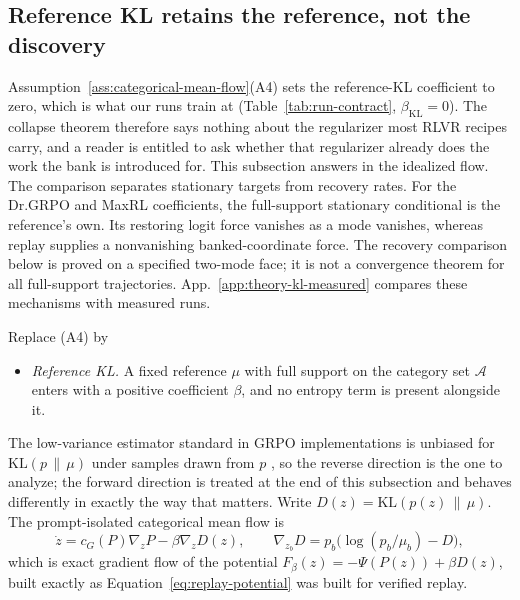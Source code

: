 \documentclass{article}
\newcommand{\1}{\mathbf 1}
\theoremstyle{remark}
\theoremstyle{definition}
\theoremstyle{plain}
\begin{document}
\subsection{Reference KL retains the reference, not the discovery}
\label{app:theory-kl}

Assumption~\ref{ass:categorical-mean-flow}(A4) sets the reference-KL
coefficient to zero, which is what our runs train at
(Table~\ref{tab:run-contract}, $\beta_{\mathrm{KL}}=0$). The collapse theorem
therefore says nothing about the regularizer most RLVR recipes carry, and a
reader is entitled to ask whether that regularizer already does the work the
bank is introduced for. This subsection answers in the idealized flow. The
comparison separates stationary targets from recovery rates. For the
Dr.GRPO and MaxRL coefficients, the full-support stationary conditional is
the reference's own. Its restoring logit force vanishes as a mode vanishes,
whereas replay supplies a nonvanishing banked-coordinate force.
The recovery comparison below is proved on a specified two-mode face; it is
not a convergence theorem for all full-support trajectories.
App.~\ref{app:theory-kl-measured} compares these mechanisms with measured runs.

Replace (A4) by

\begin{itemize}
\item[(A4$'$)] \emph{Reference KL.} A fixed reference $\mu$ with full support
  on the category set $\mathcal A$ enters with a positive coefficient $\beta$,
  and no entropy term is present alongside it.
\end{itemize}
The low-variance estimator standard in GRPO implementations is unbiased for
$\mathrm{KL}(p\,\|\,\mu)$ under samples drawn from $p$
\citep{shao2024deepseekmath}, so the reverse direction is the one to analyze;
the forward direction is treated at the end of this subsection and behaves
differently in exactly the way that matters. Write
$D(z)=\mathrm{KL}(p(z)\,\|\,\mu)$. The prompt-isolated categorical mean flow is
\begin{equation}
  \dot z=c_G(P)\nabla_zP-\beta\nabla_zD(z),
  \qquad
  \nabla_{z_b}D=p_b\big(\log(p_b/\mu_b)-D\big),
  \label{eq:kl-mean-flow}
\end{equation}
which is exact gradient flow of the potential
$F_\beta(z)=-\Psi(P(z))+\beta D(z)$, built exactly as
Equation~\eqref{eq:replay-potential} was built for verified replay.
\end{document}
